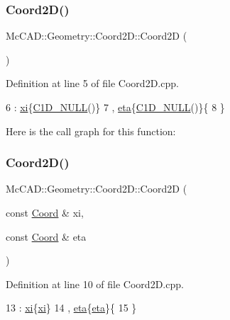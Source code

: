 \subsubsection{\texorpdfstring{Coord2\+D()}{Coord2D()}\hspace{0.1cm}{\footnotesize\ttfamily [1/4]}}
{\footnotesize\ttfamily Mc\+C\+A\+D\+::\+Geometry\+::\+Coord2\+D\+::\+Coord2D (\begin{DoxyParamCaption}{ }\end{DoxyParamCaption})}



Definition at line 5 of file Coord2\+D.\+cpp.


\begin{DoxyCode}
6     : \hyperlink{classMcCAD_1_1Geometry_1_1Coord2D_a5b99b9ce570b6bd792bd485fb2f305bb}{xi}\{\hyperlink{namespaceMcCAD_1_1Geometry_ab581ddc27c8a6530d9c1657b77ffe0bf}{C1D\_NULL}()\}
7     , \hyperlink{classMcCAD_1_1Geometry_1_1Coord2D_afa71c0967f3d43fe50e61abd731c8f5e}{eta}\{\hyperlink{namespaceMcCAD_1_1Geometry_ab581ddc27c8a6530d9c1657b77ffe0bf}{C1D\_NULL}()\}\{
8 \}
\end{DoxyCode}
Here is the call graph for this function\+:
\mbox{\label{classMcCAD_1_1Geometry_1_1Coord2D_a2c78a0bbf010eac6b30cb780dac175a3}} 
\subsubsection{\texorpdfstring{Coord2\+D()}{Coord2D()}\hspace{0.1cm}{\footnotesize\ttfamily [2/4]}}
{\footnotesize\ttfamily Mc\+C\+A\+D\+::\+Geometry\+::\+Coord2\+D\+::\+Coord2D (\begin{DoxyParamCaption}\item[{const \hyperlink{classMcCAD_1_1Geometry_1_1Coord}{Coord} \&}]{xi,  }\item[{const \hyperlink{classMcCAD_1_1Geometry_1_1Coord}{Coord} \&}]{eta }\end{DoxyParamCaption})}



Definition at line 10 of file Coord2\+D.\+cpp.


\begin{DoxyCode}
13     : \hyperlink{classMcCAD_1_1Geometry_1_1Coord2D_a5b99b9ce570b6bd792bd485fb2f305bb}{xi}\{\hyperlink{classMcCAD_1_1Geometry_1_1Coord2D_a5b99b9ce570b6bd792bd485fb2f305bb}{xi}\}
14     , \hyperlink{classMcCAD_1_1Geometry_1_1Coord2D_afa71c0967f3d43fe50e61abd731c8f5e}{eta}\{\hyperlink{classMcCAD_1_1Geometry_1_1Coord2D_afa71c0967f3d43fe50e61abd731c8f5e}{eta}\}\{
15 \}
\end{DoxyCode}
\mbox{\label{classMcCAD_1_1Geometry_1_1Coord2D_afae68072cfee4a541122ef0c63c7352c}} 
